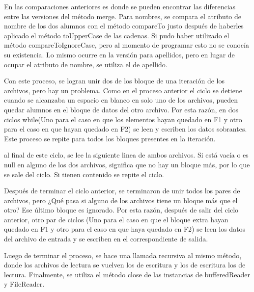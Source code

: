 \documentclass[11pt]{article}
\begin{document}
\par 
En las comparaciones anteriores es donde se pueden encontrar las diferencias entre las versiones del método merge. Para nombres, se compara el atributo de nombre de los dos alumnos con el método compareTo justo después de haberles aplicado el método toUpperCase de las cadenas. Si pudo haber utilizado el método compareToIgnoreCase, pero al momento de programar esto no se conocía su existencia. Lo mismo ocurre en la versión para apellidos, pero en lugar de ocupar el atributo de nombre, se utiliza el de apellido. 
\par
Con este proceso, se logran unir dos de los bloque de una iteración de los archivos, pero hay un problema. Como en el proceso anterior el ciclo se detiene cuando se alcanzaba un espacio en blanco en solo uno de los archivos, pueden quedar alumnos en el bloque de datos del otro archivo. Por esta razón, en dos ciclos while(Uno para el caso en que los elementos hayan quedado en F1 y otro para el caso en que hayan quedado en F2) se leen y escriben los datos sobrantes. Este proceso se repite para todos los bloques presentes en la iteración.
\par
al final de este ciclo, se lee la siguiente linea de ambos archivos. Si está vacía o es null en alguno de los dos archivos, significa que no hay un bloque más, por lo que se sale del ciclo. Si tienen contenido se repite el ciclo.
\par
Después de terminar el ciclo anterior, se terminaron de unir todos los pares de archivos, pero ¿Qué pasa si alguno de los archivos tiene un bloque más que el otro? Ese último bloque es ignorado. Por esta razón, después de salir del ciclo anterior, otro par de ciclos (Uno para el caso en que el bloque extra hayan quedado en F1 y otro para el caso en que haya quedado en F2) se leen los datos del archivo de entrada y se escriben en el correspondiente de salida.
\par
Luego de terminar el proceso, se hace una llamada recursiva al mismo método, donde los archivos de lectura se vuelven los de escritura y los de escritura los de lectura. Finalmente, se utiliza el método close de las instancias de bufferedReader y FileReader. 
\end{document}
